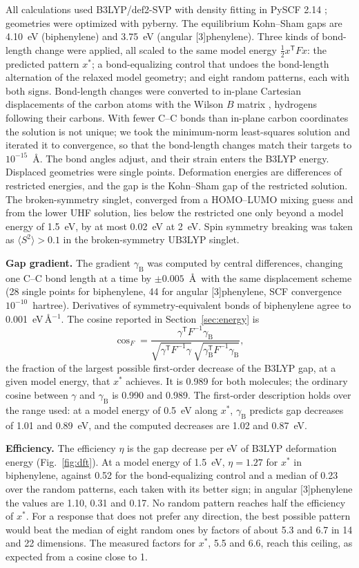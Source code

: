 \documentclass[11pt]{article}
\newcommand{\T}{\mathsf{T}}
\begin{document}
All calculations used B3LYP/def2-SVP \citep{Becke1993,LYP1988,WeigendAhlrichs2005} with density fitting in PySCF 2.14 \citep{PySCF2020}; geometries were optimized with pyberny. The equilibrium Kohn--Sham gaps are 4.10~eV (biphenylene) and 3.75~eV (angular [3]phenylene). Three kinds of bond-length change were applied, all scaled to the same model energy $\tfrac12x^\T Fx$: the predicted pattern $x^*$; a bond-equalizing control that undoes the bond-length alternation of the relaxed model geometry; and eight random patterns, each with both signs. Bond-length changes were converted to in-plane Cartesian displacements of the carbon atoms with the Wilson $B$ matrix \citep{Wilson1955}, hydrogens following their carbons. With fewer C--C bonds than in-plane carbon coordinates the solution is not unique; we took the minimum-norm least-squares solution and iterated it to convergence, so that the bond-length changes match their targets to $10^{-15}$~\AA. The bond angles adjust, and their strain enters the B3LYP energy. Displaced geometries were single points. Deformation energies are differences of restricted energies, and the gap is the Kohn--Sham gap of the restricted solution. The broken-symmetry singlet, converged from a HOMO--LUMO mixing guess and from the lower UHF solution, lies below the restricted one only beyond a model energy of 1.5~eV, by at most 0.02~eV at 2~eV. Spin symmetry breaking was taken as $\langle S^2\rangle>0.1$ in the broken-symmetry UB3LYP singlet.

\textbf{Gap gradient.} The gradient $\gamma_{\mathrm B}$ was computed by central differences, changing one C--C bond length at a time by $\pm0.005$~\AA\ with the same displacement scheme (28 single points for biphenylene, 44 for angular [3]phenylene, SCF convergence $10^{-10}$~hartree). Derivatives of symmetry-equivalent bonds of biphenylene agree to 0.001~eV\,\AA$^{-1}$. The cosine reported in Section~\ref{sec:energy} is
\[
\cos_F=\frac{\gamma^\T F^{-1}\gamma_{\mathrm B}}{\sqrt{\gamma^\T F^{-1}\gamma}\,\sqrt{\gamma_{\mathrm B}^\T F^{-1}\gamma_{\mathrm B}}},
\]
the fraction of the largest possible first-order decrease of the B3LYP gap, at a given model energy, that $x^*$ achieves. It is 0.989 for both molecules; the ordinary cosine between $\gamma$ and $\gamma_{\mathrm B}$ is 0.990 and 0.989. The first-order description holds over the range used: at a model energy of 0.5~eV along $x^*$, $\gamma_{\mathrm B}$ predicts gap decreases of 1.01 and 0.89~eV, and the computed decreases are 1.02 and 0.87~eV.

\textbf{Efficiency.} The efficiency $\eta$ is the gap decrease per eV of B3LYP deformation energy (Fig.~\ref{fig:dft}). At a model energy of 1.5~eV, $\eta=1.27$ for $x^*$ in biphenylene, against 0.52 for the bond-equalizing control and a median of 0.23 over the random patterns, each taken with its better sign; in angular [3]phenylene the values are 1.10, 0.31 and 0.17. No random pattern reaches half the efficiency of $x^*$. For a response that does not prefer any direction, the best possible pattern would beat the median of eight random ones by factors of about 5.3 and 6.7 in 14 and 22 dimensions. The measured factors for $x^*$, 5.5 and 6.6, reach this ceiling, as expected from a cosine close to 1.
\end{document}
